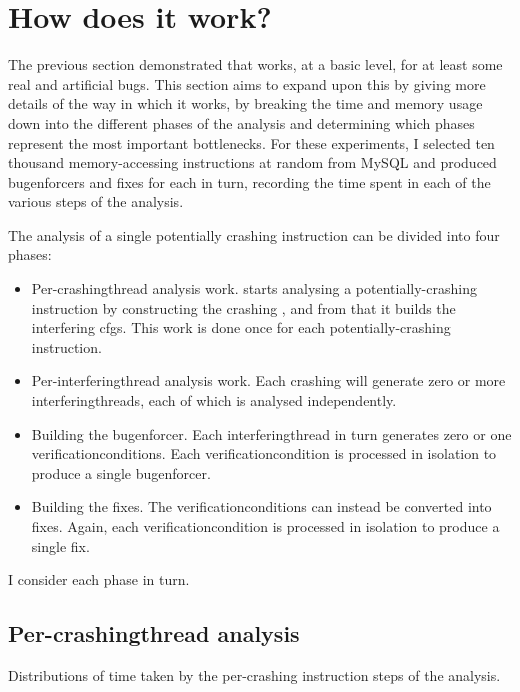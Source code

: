 \section{How does it work?}
\label{sect:eval:how_does_it_work}

The previous section demonstrated that {\implementation} works, at a basic
level, for at least some real and artificial bugs.  This section aims
to expand upon this by giving more details of the way in which it
works, by breaking the time and memory usage down into the different
phases of the analysis and determining which phases represent the most
important bottlenecks.  For these experiments, I selected ten thousand
memory-accessing instructions at random from MySQL and produced
\glspl{bugenforcer} and fixes for each in turn, recording the time
spent in each of the various steps of the analysis.

The analysis of a single potentially crashing instruction can be
divided into four phases:
\begin{itemize}
\item Per-\gls{crashingthread} analysis work.  {\implementation} starts
  analysing a potentially-crashing instruction by constructing the
  crashing {\StateMachine}, and from that it builds the interfering
  \glspl{cfg}.  This work is done once for each potentially-crashing
  instruction.
\item Per-\gls{interferingthread} analysis work.  Each crashing
  {\StateMachine} will generate zero or more
  \glspl{interferingthread}, each of which is analysed independently.
\item Building the \gls{bugenforcer}.  Each \gls{interferingthread} in
  turn generates zero or one \glspl{verificationcondition}.  Each
  \gls{verificationcondition} is processed in isolation to produce a
  single \gls{bugenforcer}.
\item Building the fixes.  The \glspl{verificationcondition} can
  instead be converted into fixes.  Again, each
  \gls{verificationcondition} is processed in isolation to produce a
  single fix.
\end{itemize}
I consider each phase in turn.

\subsection{Per-\gls{crashingthread} analysis}

\begin{sanefig}
  \caption{Distributions of time taken by the per-crashing instruction
    steps of the analysis.}
  \label{fig:eval:how:per_crashing_times}
\end{sanefig}

